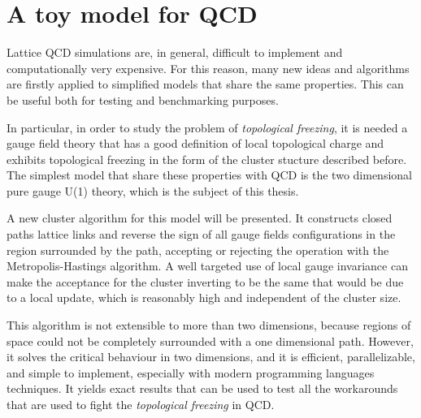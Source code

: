 \section*{A toy model for QCD}
Lattice QCD simulations are, in general, difficult to implement and computationally very expensive.
For this reason, many new ideas and algorithms are firstly applied to simplified models that share the same properties.
This can be useful both for testing and benchmarking purposes.

In particular, in order to study the problem of \emph{topological freezing},
it is needed a gauge field theory that has a good definition of local topological charge and exhibits topological freezing in the form of the cluster stucture described before.
The simplest model that share these properties with QCD is the two dimensional pure gauge U(1) theory, which is the subject of this thesis.

A new cluster algorithm for this model will be presented.
It constructs closed paths lattice links and reverse the sign of all gauge fields configurations in the region surrounded by the path,
accepting or rejecting the operation with the Metropolis-Hastings algorithm.
A well targeted use of local gauge invariance can make the acceptance for the cluster inverting to be the same that would be due to a local update,
which is reasonably high%
and independent of the cluster size.

This algorithm is not extensible to more than two dimensions,
because regions of space could not be completely surrounded with a one dimensional path.
However, it solves the critical behaviour in two dimensions, and it is efficient, parallelizable, and simple to implement, especially with modern programming languages techniques.
It yields exact results that can be used to test all the workarounds that are used to fight the \emph{topological freezing} in QCD. 


